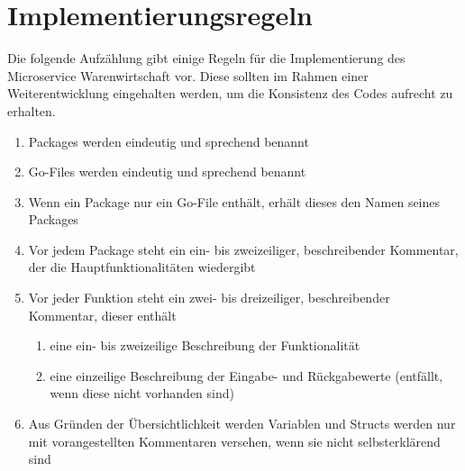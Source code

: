 \section{Implementierungsregeln}
\label{sec: Implementierungsregeln}
Die folgende Aufzählung gibt einige Regeln für die Implementierung des Microservice Warenwirtschaft vor. Diese sollten im Rahmen einer Weiterentwicklung eingehalten werden, um die Konsistenz des Codes aufrecht zu erhalten. 

\begin{enumerate}
	\item Packages werden eindeutig und sprechend benannt
	\item Go-Files werden eindeutig und sprechend benannt
	\item Wenn ein Package nur ein Go-File enthält, erhält dieses den Namen seines Packages
	\item Vor jedem Package steht ein ein- bis zweizeiliger, beschreibender Kommentar, der die Hauptfunktionalitäten wiedergibt
	\item Vor jeder Funktion steht ein zwei- bis dreizeiliger, beschreibender Kommentar, dieser enthält
	\begin{enumerate}
		\item eine ein- bis zweizeilige Beschreibung der Funktionalität
		\item eine einzeilige Beschreibung der Eingabe- und Rückgabewerte (entfällt, wenn diese nicht vorhanden sind)
	\end{enumerate}
	\item Aus Gründen der Übersichtlichkeit werden Variablen und Structs werden nur mit vorangestellten Kommentaren versehen, wenn sie nicht selbsterklärend sind
\end{enumerate}

